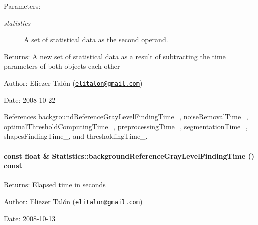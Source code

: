 \begin{Desc}
\item[Parameters:]
\begin{description}
\item[{\em statistics}]A set of statistical data as the second operand.\end{description}
\end{Desc}
\begin{Desc}
\item[Returns:]A new set of statistical data as a result of subtracting the time parameters of both objects each other\end{Desc}
\begin{Desc}
\item[Author:]Eliezer Talón (\href{mailto:elitalon@gmail.com}{\tt elitalon@gmail.com}) \end{Desc}
\begin{Desc}
\item[Date:]2008-10-22 \end{Desc}


References backgroundReferenceGrayLevelFindingTime\_\-, noiseRemovalTime\_\-, optimalThresholdComputingTime\_\-, preprocessingTime\_\-, segmentationTime\_\-, shapesFindingTime\_\-, and thresholdingTime\_\-.\hypertarget{class_statistics_d65adc1b3bd1d560408c5f9e06fde3d4}{
\paragraph[backgroundReferenceGrayLevelFindingTime]{\setlength{\rightskip}{0pt plus 5cm}const float \& Statistics::backgroundReferenceGrayLevelFindingTime () const}\hfill}
\label{class_statistics_d65adc1b3bd1d560408c5f9e06fde3d4}


\begin{Desc}
\item[Returns:]Elapsed time in seconds\end{Desc}
\begin{Desc}
\item[Author:]Eliezer Talón (\href{mailto:elitalon@gmail.com}{\tt elitalon@gmail.com}) \end{Desc}
\begin{Desc}
\item[Date:]2008-10-13 \end{Desc}



